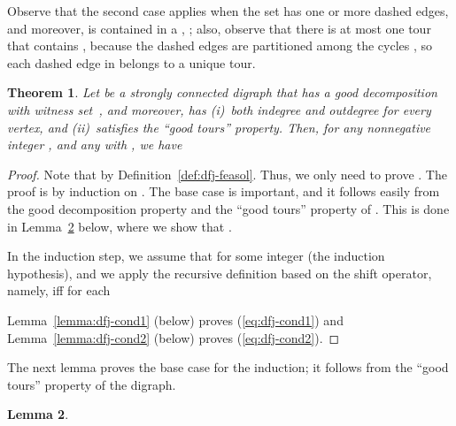 \documentclass[11pt]{article}
\newtheorem{theorem}{Theorem}[section]
\newtheorem{lemma}[theorem]{Lemma}
\begin{document}
Observe that the second case applies when
the set  has one or more dashed edges,
and moreover,  is contained in a
, ;
also, observe that there is at most one tour that contains ,
because the dashed edges are partitioned among the cycles ,
so each dashed edge in  belongs to a unique tour.


\begin{theorem}
\label{thm:dfj-feasible}
Let  be a strongly connected digraph that
has a good decomposition with witness set~,
and moreover,
has (i)~both indegree and outdegree  for every vertex,
and (ii)~satisfies the ``good tours'' property.
Then, for any nonnegative integer , and
any  with ,
we have

\end{theorem}

\begin{proof}
Note that  by Definition~\ref{def:dfj-feasol}.
Thus, we only need to prove .
The proof is by induction on .
The base case is important, and it follows easily from the
good decomposition property and the ``good tours'' property of .
This is done in Lemma~\ref{lemma:dfj-basecase} below, where we show that
.

In the induction step, we assume that
 for some integer 
(the induction hypothesis),
and we apply the recursive definition based
on the shift operator, namely,
 iff for each 

Lemma~\ref{lemma:dfj-cond1} (below) proves (\ref{eq:dfj-cond1}) and
Lemma~\ref{lemma:dfj-cond2} (below) proves (\ref{eq:dfj-cond2}).
\end{proof}

The next lemma proves the base case for the induction;
it follows from the ``good tours'' property of the digraph.

\begin{lemma} \label{lemma:dfj-basecase}

\end{lemma}
\end{document}
